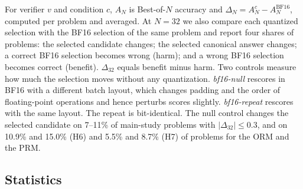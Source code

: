 For verifier $v$ and condition $c$, $A_N$ is Best-of-$N$ accuracy and
$\Delta_N = A_N^{c} - A_N^{\mathrm{BF16}}$, computed per problem and averaged. At $N=32$ we also compare each quantized selection with the BF16 selection of the
same problem and report four shares of problems: the selected candidate changes; the
selected canonical answer changes; a correct BF16 selection becomes wrong (harm); and a
wrong BF16 selection becomes correct (benefit). $\Delta_{32}$ equals benefit minus
harm. Two controls measure how much the selection moves without any quantization.
\emph{bf16-null} rescores in BF16 with a different batch layout, which changes padding
and the order of floating-point operations and hence perturbs scores slightly.
\emph{bf16-repeat} rescores with the same layout. The repeat is
bit-identical. The null control changes the selected candidate on 7--11\% of
main-study problems with $|\Delta_{32}| \le 0.3$\pp, and on 10.9\% and 15.0\% (H6) and
5.5\% and 8.7\% (H7) of problems for the ORM and the PRM.

\subsection{Statistics}\label{sec:stats}


